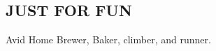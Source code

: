 \documentclass{res}
\begin{document}
\begin{resume}
\section{JUST FOR FUN}          
    Avid Home Brewer, Baker, climber, and runner.\\

\end{resume}
\end{document}
